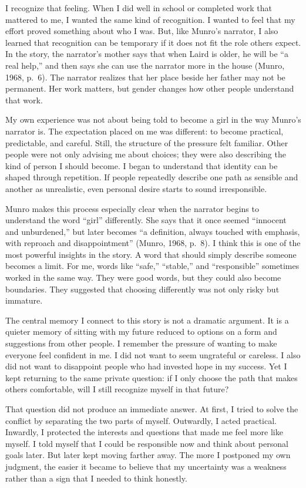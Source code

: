 \documentclass[12pt]{article}
\begin{document}
I recognize that feeling. When I did well in school or completed work that mattered to me, I wanted the same kind of recognition. I wanted to feel that my effort proved something about who I was. But, like Munro's narrator, I also learned that recognition can be temporary if it does not fit the role others expect. In the story, the narrator's mother says that when Laird is older, he will be ``a real help,'' and then says she can use the narrator more in the house (Munro, 1968, p.~6). The narrator realizes that her place beside her father may not be permanent. Her work matters, but gender changes how other people understand that work.

My own experience was not about being told to become a girl in the way Munro's narrator is. The expectation placed on me was different: to become practical, predictable, and careful. Still, the structure of the pressure felt familiar. Other people were not only advising me about choices; they were also describing the kind of person I should become. I began to understand that identity can be shaped through repetition. If people repeatedly describe one path as sensible and another as unrealistic, even personal desire starts to sound irresponsible.

Munro makes this process especially clear when the narrator begins to understand the word ``girl'' differently. She says that it once seemed ``innocent and unburdened,'' but later becomes ``a definition, always touched with emphasis, with reproach and disappointment'' (Munro, 1968, p.~8). I think this is one of the most powerful insights in the story. A word that should simply describe someone becomes a limit. For me, words like ``safe,'' ``stable,'' and ``responsible'' sometimes worked in the same way. They were good words, but they could also become boundaries. They suggested that choosing differently was not only risky but immature.

The central memory I connect to this story is not a dramatic argument. It is a quieter memory of sitting with my future reduced to options on a form and suggestions from other people. I remember the pressure of wanting to make everyone feel confident in me. I did not want to seem ungrateful or careless. I also did not want to disappoint people who had invested hope in my success. Yet I kept returning to the same private question: if I only choose the path that makes others comfortable, will I still recognize myself in that future?

That question did not produce an immediate answer. At first, I tried to solve the conflict by separating the two parts of myself. Outwardly, I acted practical. Inwardly, I protected the interests and questions that made me feel more like myself. I told myself that I could be responsible now and think about personal goals later. But later kept moving farther away. The more I postponed my own judgment, the easier it became to believe that my uncertainty was a weakness rather than a sign that I needed to think honestly.
\end{document}
